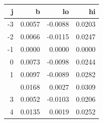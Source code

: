 
\begin{tabular}{rrrr}
\toprule
j & b & lo & hi\\
\midrule
-3 & 0.0057 & -0.0088 & 0.0203\\
-2 & 0.0066 & -0.0115 & 0.0247\\
-1 & 0.0000 & 0.0000 & 0.0000\\
0 & 0.0073 & -0.0098 & 0.0244\\
1 & 0.0097 & -0.0089 & 0.0282\\
\addlinespace
2 & 0.0168 & 0.0027 & 0.0309\\
3 & 0.0052 & -0.0103 & 0.0206\\
4 & 0.0135 & 0.0019 & 0.0252\\
\bottomrule
\end{tabular}
